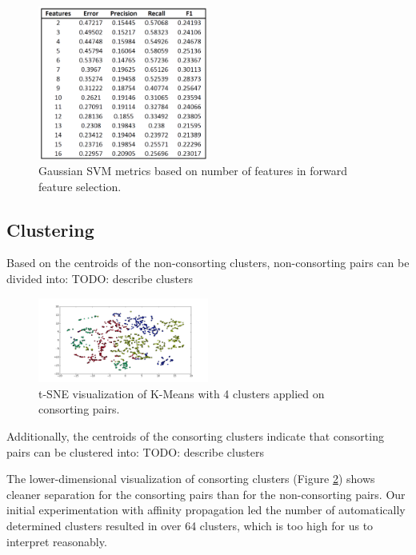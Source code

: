 \documentclass[twoside,twocolumn,paper=letter,fontsize=11pt]{article}
\begin{document}
\begin{figure}
      \centering
          \includegraphics[width=0.5\textwidth]{../figs/ClassificationMetrics_RbfSVM.png}
  \caption{Gaussian SVM metrics based on number of features in forward feature selection.}
  \label{fig:rbf_svm_vis}
\end{figure}


\subsection{Clustering}
Based on the centroids of the non-consorting clusters, non-consorting pairs can
be divided into: {TODO: describe clusters}
\begin{figure}[h]
      \centering
          \includegraphics[width=0.5\textwidth]{../figs/consort_kmeans_2d_tsne.png}
  \caption{t-SNE visualization of K-Means with 4 clusters applied on consorting
  pairs.}
  \label{fig:consort_clustering_vis}
\end{figure}
Additionally, the centroids of the consorting clusters indicate that consorting
pairs can be clustered into: {TODO: describe clusters}

The lower-dimensional visualization of consorting clusters  (Figure
\ref{fig:consort_clustering_vis}) shows cleaner separation for the consorting
pairs than for the non-consorting pairs. Our initial experimentation with
affinity propagation led the number of automatically determined clusters
resulted in over 64 clusters, which is too high for us to interpret reasonably.
\end{document}
